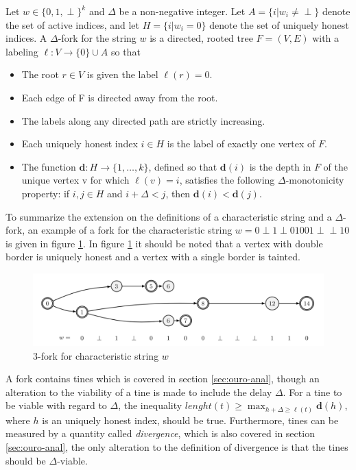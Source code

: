 \begin{mydef}
\label{def:delta-fork}
Let $w \in \{0,1,\perp\}^k$ and $\Delta$ be a non-negative integer. Let $A = \{i | w_i \neq \perp \}$ denote the set of active indices, and let $H = \{i | w_i = 0\}$ denote the set of uniquely honest indices. A $\Delta$-fork for the string $w$ is a directed, rooted tree $F = (V,E)$ with a labeling $\ell : V \xrightarrow{} \{0\}\cup A$ so that 
\begin{itemize}
    \item The root $r \in V$ is given the label $\ell(r)=0$.
    \item Each edge of F is directed away from the root.
    \item The labels along any directed path are strictly increasing.
    \item Each uniquely honest index $i\in H$ is the label of exactly one vertex of $F$.
    \item The function $\textbf{d}: H \xrightarrow{} \{1,\ldots,k\}$, defined so that $\textbf{d}(i)$ is the depth in $F$ of the unique vertex v for which $\ell(v)=i$, satisfies the following $\Delta$-monotonicity property: if $i,j\in H$ and $i+ \Delta < j$, then $\textbf{d}(i) < \textbf{d}(j)$.
\end{itemize}
\end{mydef}

To summarize the extension on the definitions of a characteristic string and a $\Delta$-fork, an example of a fork for the characteristic string $w = 0\perp1\perp01001\perp\perp10$ is given in figure \ref{fig:delta-fork}. In figure \ref{fig:delta-fork} it should be noted that a vertex with double border is uniquely honest and a vertex with a single border is tainted.

\begin{figure}[H]
    \centering
    \includegraphics[width = \linewidth]{images/ouro-delta-fork.png}
    \caption{3-fork for characteristic string $w$}
    \label{fig:delta-fork}
\end{figure}

A fork contains tines which is covered in section \ref{sec:ouro-anal}, though an alteration to the viability of a tine is made to include the delay $\Delta$. For a tine to be viable with regard to $\Delta$, the inequality $lenght(t) \geq \max_{h+\Delta \geq \ell(t)} \textbf{d}(h)$, where $h$ is an uniquely honest index, should be true. Furthermore, tines can be measured by a quantity called \emph{divergence}, which is also covered in section \ref{sec:ouro-anal}, the only alteration to the definition of divergence is that the tines should be $\Delta$-viable. \\

